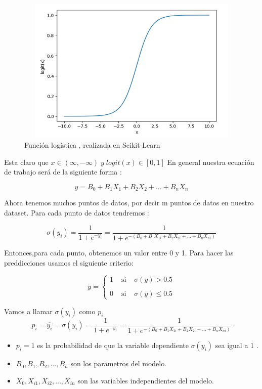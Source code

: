 \begin{figure}[H]
    \centering
       \includegraphics[width=12cm, height=7cm ]{Imagenes/Logit.PNG}
      \caption{Función logística , realizada en Scikit-Learn}
      \label{fig:logit}
  \end{figure} 

Esta claro que $ \displaystyle x \in ( \infty , {-}\infty ) \;  y \; logit(x) \in [0 , 1]$ \medskip
En general nuestra ecuación de trabajo será de la siguiente forma : \medskip

$$ \displaystyle y=B_0 + B_1X_1 + B_2X_2+ \dots + B_nX_n $$

 
Ahora tenemos muchos puntos de datos, por decir m puntos de datos en nuestro dataset. Para cada
punto de datos tendremos : \medskip

$$\displaystyle \sigma (y_i)= \frac{1}{1+e^{-y_i}} = \frac{1}{1+e^{-(B_0 + B_1X_{1i} + B_2X_{2i}+ \dots + B_nX_{ni})}} $$ \medskip

 Entonces,para cada punto, obtenemos un valor entre 0 y 1. Para hacer las preddicciones
 usamos el siguiente criterio: \medskip

\[
y = \left\{ \begin{array}{lcl}
1 & \mbox{ si } & \sigma (y) > 0.5 \\
& & \\
0 & \mbox{ si } & \sigma (y) \leq 0.5
\end{array}
\right.
\] \medskip

 Vamos a llamar $\sigma(y_i)$ como $p_i$ \\
 $$\displaystyle p_i =\widehat{y_i} = \sigma (y_i)= \frac{1}{1+e^{-y_i}} = \frac{1}{1+e^{-(B_0 + B_1X_{1i} + B_2X_{2i}+ \dots + B_nX_{ni})}} $$ \medskip
 
 \begin{itemize}
    \item $\displaystyle p_i = 1$ es la probabilidad de que la variable dependiente $\sigma (y_i)$ sea igual a 1 .
    \item $\displaystyle B_0 , B_1, B_2 , \dots,B_n$ son los parametros del modelo.
    \item $\displaystyle X_0 , X_{i1}, X_{i2} , \dots,X_{in}$ son las variables independientes del modelo.    
\end{itemize}

